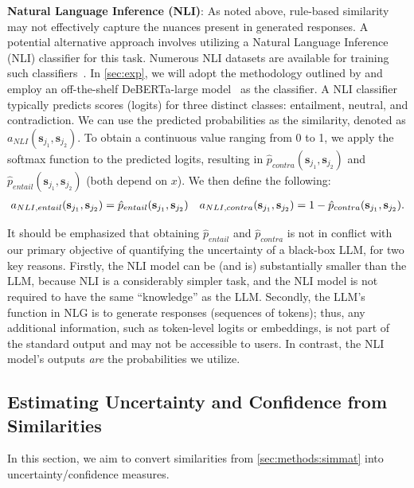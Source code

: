 \textbf{Natural Language Inference (NLI)}:
As noted above, rule-based similarity may not effectively capture the nuances present in generated responses. 
A potential alternative approach involves utilizing a Natural Language Inference (NLI) classifier for this task. 
Numerous NLI datasets are available for training such classifiers~\citep{williams-etal-2018-broad,bowman-etal-2015-large,poliak-2020-survey}.
In \cref{sec:exp}, we will adopt the methodology outlined by \citet{kuhn2023semantic} and employ an off-the-shelf DeBERTa-large model~\citep{he2021deberta} as the classifier. 
A NLI classifier typically predicts scores (logits) for three distinct classes: entailment, neutral, and contradiction. 
We can use the predicted probabilities as the similarity, denoted as $a_{NLI}(\mathbf{s}_{j_1}, \mathbf{s}_{j_2})$. 
To obtain a continuous value ranging from 0 to 1, we apply the softmax function to the predicted logits, resulting in $\hat{p}_{contra}(\mathbf{s}_{j_1}, \mathbf{s}_{j_2})$ and $\hat{p}_{entail}(\mathbf{s}_{j_1}, \mathbf{s}_{j_2})$ (both depend on $x$).  
We then define the following:
\begin{align}
    &a_{NLI,entail}(\mathbf{s}_{j_1},\mathbf{s}_{j_2}) = \hat{p}_{entail}(\mathbf{s}_{j_1}, \mathbf{s}_{j_2})
    &a_{NLI,contra}(\mathbf{s}_{j_1},\mathbf{s}_{j_2}) = 1- \hat{p}_{contra}(\mathbf{s}_{j_1}, \mathbf{s}_{j_2}).
\end{align}

It should be emphasized that obtaining $\hat{p}_{entail}$ and $\hat{p}_{contra}$ is not in conflict with our primary objective of quantifying the uncertainty of a black-box LLM, for two key reasons. 
Firstly, the NLI model can be (and is) substantially smaller than the LLM, because NLI is a considerably simpler task, and the NLI model is not required to have the same ``knowledge'' as the LLM. 
Secondly, the LLM's function in NLG is to generate responses (sequences of tokens); thus, any additional information, such as token-level logits or embeddings, is not part of the standard output and may not be accessible to users. 
In contrast, the NLI model's outputs \textit{are} the probabilities we utilize.


\subsection{Estimating Uncertainty and Confidence from Similarities}\label{sec:methods:uq}
In this section, we aim to convert similarities from \cref{sec:methods:simmat} into uncertainty/confidence measures.

